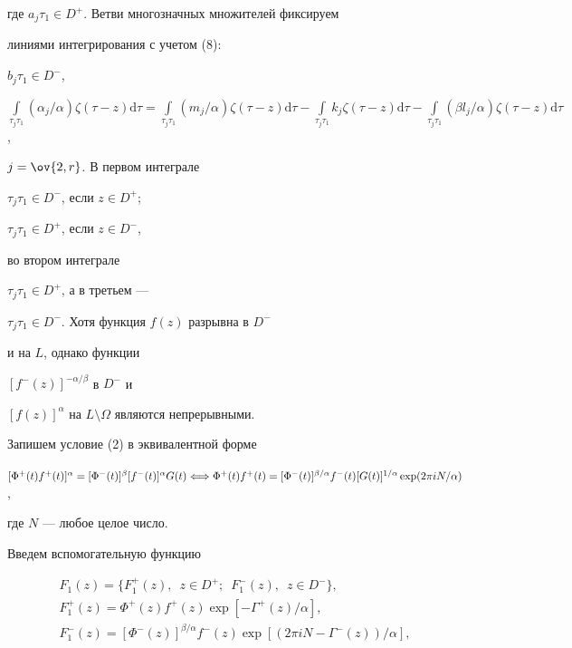 где $a_j\tau_1\in D^{+}$. Ветви многозначных множителей фиксируем


линиями интегрирования с учетом (8):


$b_j\tau_1\in D^-$,


$\int\limits_{\tau_j \tau_1}(\alpha_j/\alpha)\zeta(\tau-z)\mathrm d\tau =


\int\limits_{\tau_j \tau_1}(m_j/\alpha)\zeta(\tau-z) \mathrm d\tau -


\int\limits_{\tau_j \tau_1}k_j\zeta(\tau-z) \mathrm d\tau -


\int\limits_{\tau_j \tau_1}(\beta l_j/\alpha)\zeta(\tau-z) \mathrm d\tau$,


$j=\ov{2,r}$. В первом интеграле


$\tau_j\tau_1\in D^{-}$, если $z\in D^{+}$;


$\tau_j\tau_1\in D^{+}$, если $z\in D^{-}$,


во втором интеграле


$\tau_j\tau_1\in D^{+}$, а в третьем ---


$\tau_j\tau_1\in D^{-}$. Хотя функция $f(z)$ разрывна в $D^{-}$


и на $L$, однако функции


$[f^{-}(z)]^{-\alpha/\beta}$ в $D^{-}$ и


$[f(z)]^{\alpha}$ на $L\setminus\Omega$ являются непрерывными.





Запишем условие (2) в эквивалентной форме


$[\Phi^{+}(t)f^{+}(t)]^{\alpha}=[\Phi^{-}(t)]^{\beta}


[f^{-}(t)]^{\alpha}G(t)\Longleftrightarrow \linebreak


\Phi^{+}(t)f^{+}(t)=


[\Phi^{-}(t)]^{\beta/\alpha}f^{-}(t)


[G(t)]^{1/\alpha}\exp(2\pi iN/\alpha)$,


где $N$ --- любое целое число.





Введем вспомогательную функцию


\begin{gather*}


F_1(z)=\{F_{1}^{+}(z),\ \;z\in D^{+};\ \;F_{1}^{-}(z),\ \;z\in


D^{-}\},\\


%


F_{1}^{+}(z)=\Phi^{+}(z)f^{+}(z)\exp[-\Gamma^{+}(z)/\alpha ], \\


%


F_{1}^{-}(z)=[\Phi^{-}(z)]^{\beta/\alpha}f^{-}(z)


\exp[(2\pi iN-\Gamma^{-}(z))/\alpha],


\end{gather*}


